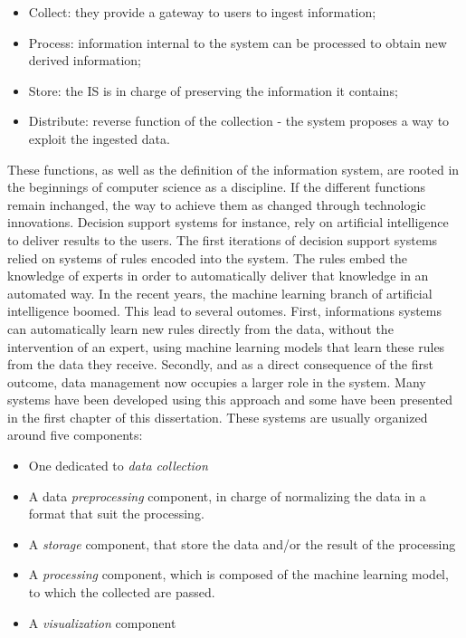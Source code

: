 \begin{itemize}
    \item Collect: they provide a gateway to users to ingest information;
    \item Process: information internal to the system can be processed to obtain new derived information;
    \item Store: the IS is in charge of preserving the information it contains;
    \item Distribute: reverse function of the collection - the system proposes a way to exploit the ingested data.
\end{itemize}

These functions, as well as the definition of the information system, are rooted in the beginnings of computer science as a discipline.
If the different functions remain inchanged, the way to achieve them as changed through technologic innovations.
Decision support systems for instance, rely on artificial intelligence to deliver results to the users.
The first iterations of decision support systems relied on systems of rules encoded into the system.
The rules embed the knowledge of experts in order to automatically deliver that knowledge in an automated way.
In the recent years, the machine learning branch of artificial intelligence boomed.
This lead to several outomes.
First, informations systems can automatically learn new rules directly from the data, without
the intervention of an expert, using machine learning models that learn these rules from the data they receive.
Secondly, and as a direct consequence of the first outcome, data management now occupies a larger role in the system.
Many systems have been developed using this approach and some have been presented in the first chapter of this dissertation.
These systems are usually organized around five components:

\begin{itemize}
    \item One dedicated to \textit{data collection}
    \item A data \textit{preprocessing} component, in charge of normalizing the data in a format that suit the processing.
    \item A \textit{storage} component, that store the data and/or the result of the processing
    \item A \textit{processing} component, which is composed of the machine learning model, to which the collected are passed.
    \item A \textit{visualization} component
\end{itemize}

